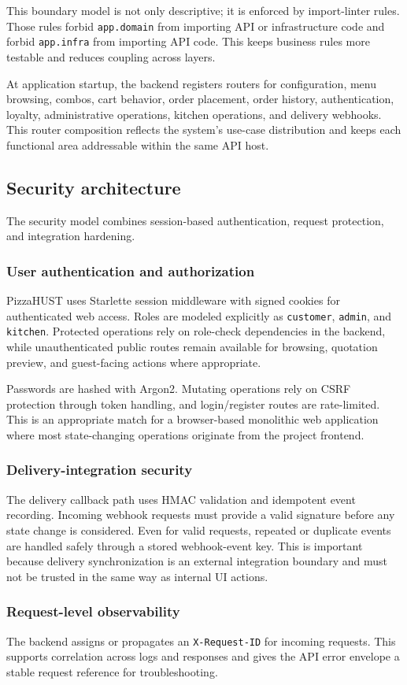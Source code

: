 This boundary model is not only descriptive; it is enforced by import-linter rules. Those rules forbid \texttt{app.domain} from importing API or infrastructure code and forbid \texttt{app.infra} from importing API code. This keeps business rules more testable and reduces coupling across layers.

At application startup, the backend registers routers for configuration, menu browsing, combos, cart behavior, order placement, order history, authentication, loyalty, administrative operations, kitchen operations, and delivery webhooks. This router composition reflects the system's use-case distribution and keeps each functional area addressable within the same API host.

\subsection{Security architecture}

The security model combines session-based authentication, request protection, and integration hardening.

\subsubsection{User authentication and authorization}

PizzaHUST uses Starlette session middleware with signed cookies for authenticated web access. Roles are modeled explicitly as \texttt{customer}, \texttt{admin}, and \texttt{kitchen}. Protected operations rely on role-check dependencies in the backend, while unauthenticated public routes remain available for browsing, quotation preview, and guest-facing actions where appropriate.

Passwords are hashed with Argon2. Mutating operations rely on CSRF protection through token handling, and login/register routes are rate-limited. This is an appropriate match for a browser-based monolithic web application where most state-changing operations originate from the project frontend.

\subsubsection{Delivery-integration security}

The delivery callback path uses HMAC validation and idempotent event recording. Incoming webhook requests must provide a valid signature before any state change is considered. Even for valid requests, repeated or duplicate events are handled safely through a stored webhook-event key. This is important because delivery synchronization is an external integration boundary and must not be trusted in the same way as internal UI actions.

\subsubsection{Request-level observability}

The backend assigns or propagates an \texttt{X-Request-ID} for incoming requests. This supports correlation across logs and responses and gives the API error envelope a stable request reference for troubleshooting.
